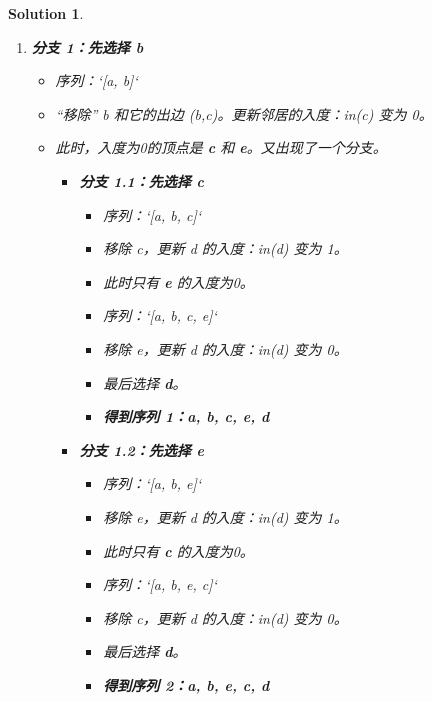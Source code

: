 \documentclass[UTF8]{report}
\newtheorem{solution}{Solution}
\theoremstyle{MyLineTheoremStyle} %
\theoremstyle{MyBlockTheoremStyle} %
\theoremstyle{MySubsubsectionStyle} %
\begin{document}
\begin{solution}
\begin{enumerate}
    \item \textbf{分支 1：先选择 b}
    \begin{itemize}
        \item 序列：`[a, b]`
        \item “移除” b 和它的出边 (b,c)。更新邻居的入度：in(c) 变为 0。
        \item 此时，入度为0的顶点是 \textbf{c} 和 \textbf{e}。又出现了一个分支。
        \begin{itemize}
            \item \textbf{分支 1.1：先选择 c}
            \begin{itemize}
                \item 序列：`[a, b, c]`
                \item 移除 c，更新 d 的入度：in(d) 变为 1。
                \item 此时只有 \textbf{e} 的入度为0。
                \item 序列：`[a, b, c, e]`
                \item 移除 e，更新 d 的入度：in(d) 变为 0。
                \item 最后选择 \textbf{d}。
                \item \textbf{得到序列 1：a, b, c, e, d}
            \end{itemize}
            \item \textbf{分支 1.2：先选择 e}
            \begin{itemize}
                \item 序列：`[a, b, e]`
                \item 移除 e，更新 d 的入度：in(d) 变为 1。
                \item 此时只有 \textbf{c} 的入度为0。
                \item 序列：`[a, b, e, c]`
                \item 移除 c，更新 d 的入度：in(d) 变为 0。
                \item 最后选择 \textbf{d}。
                \item \textbf{得到序列 2：a, b, e, c, d}
            \end{itemize}
        \end{itemize}
    \end{itemize}


\end{enumerate}
\end{solution}
\end{document}
